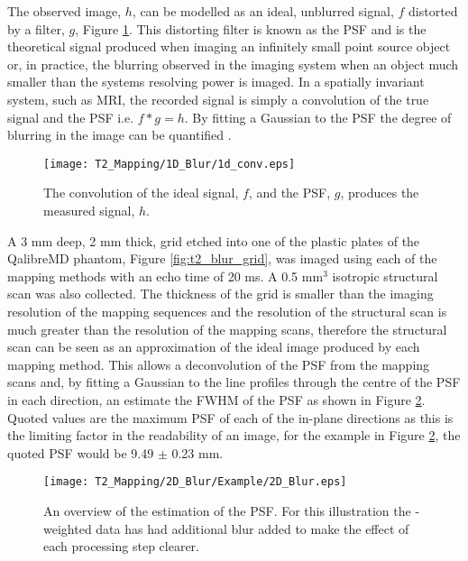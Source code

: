 The observed image, $h$, can be modelled as an ideal, unblurred signal, $f$ distorted by a filter, $g$, Figure \ref{fig:t2_1d_blur}. This distorting filter is known as the \ac{PSF} and is the theoretical signal produced when imaging an infinitely small point source object or, in practice, the blurring observed in the imaging system when an object much smaller than the systems resolving power is imaged. In a spatially invariant system, such as \ac{MRI}, the recorded signal is simply a convolution of the true signal and the \ac{PSF} i.e. $f \ast g = h$. By fitting a Gaussian to the \ac{PSF} the degree of blurring in the image can be quantified \cite{chaimow_more_2017, chaimow_more_2017-1}. 
\begin{figure}[H]
	\centering
	\texttt{[image: T2\_Mapping/1D\_Blur/1d\_conv.eps]}
	\caption{The convolution of the ideal signal, $f$, and the \ac{PSF}, $g$, produces the measured signal, $h$.}
	\label{fig:t2_1d_blur}	
\end{figure}

A 3 mm deep, 2 mm thick, grid etched into one of the plastic plates of the QalibreMD phantom, Figure \ref{fig:t2_blur_grid}, was imaged using each of the \ttwo mapping methods with an echo time of 20 ms. A 0.5 mm$^3$ isotropic structural scan was also collected. The thickness of the grid is smaller than the imaging resolution of the \ttwo mapping sequences and the resolution of the structural scan is much greater than the resolution of the \ttwo mapping scans, therefore the structural scan can be seen as an approximation of the ideal image produced by each \ttwo mapping method. This allows a deconvolution of the \ac{PSF} from the \ttwo mapping scans and, by fitting a Gaussian to the line profiles through the centre of the \ac{PSF} in each direction, an estimate the \ac{FWHM} of the \ac{PSF} as shown in Figure \ref{fig:t2_2d_blur}. Quoted values are the maximum \ac{PSF} of each of the in-plane directions as this is the limiting factor in the readability of an image, for the example in Figure \ref{fig:t2_2d_blur}, the quoted \ac{PSF} would be 9.49 $\pm$ 0.23 mm.

\begin{figure}[H]
	\centering
	\texttt{[image: T2\_Mapping/2D\_Blur/Example/2D\_Blur.eps]}
	\caption{An overview of the estimation of the \ac{PSF}. For this illustration the \ttwo-weighted data has had additional blur added to make the effect of each processing step clearer.}
	\label{fig:t2_2d_blur}	
\end{figure}

